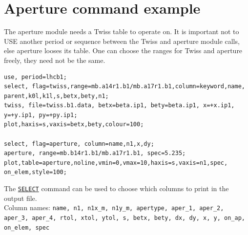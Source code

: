 


\section{Aperture command example}
\label{sec:aperexample}
The aperture module needs a Twiss table to operate on. It is important
not to USE another period or sequence between the Twiss and aperture
module calls, else aperture looses its table. One can choose the ranges
for Twiss and aperture freely, they need not be the same.  

\begin{verbatim}
use, period=lhcb1;
select, flag=twiss,range=mb.a14r1.b1/mb.a17r1.b1,column=keyword,name,
parent,k0l,k1l,s,betx,bety,n1;
twiss, file=twiss.b1.data, betx=beta.ip1, bety=beta.ip1, x=+x.ip1, 
y=+y.ip1, py=+py.ip1;
plot,haxis=s,vaxis=betx,bety,colour=100;

select, flag=aperture, column=name,n1,x,dy;
aperture, range=mb.b14r1.b1/mb.a17r1.b1, spec=5.235;
plot,table=aperture,noline,vmin=0,vmax=10,haxis=s,vaxis=n1,spec,
on_elem,style=100;
\end{verbatim}

The \hyperref[sec:select]{\texttt{SELECT}} command can be  used to
choose which columns to print in the output file.   
\\ Column names: \texttt{name, n1, n1x\_m, n1y\_m, apertype, aper\_1, aper\_2,
aper\_3, aper\_4, rtol, xtol, ytol, s, betx, bety, dx, dy, x, y, on\_ap,
on\_elem, spec}  

